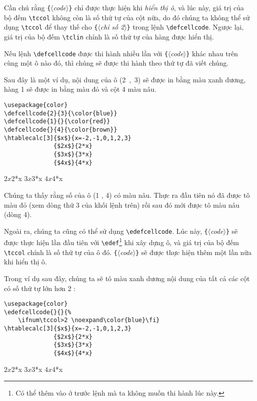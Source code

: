 \documentclass[a4paper,10pt]{article}
\newcommand\argu[1]{$\langle$\textit{#1}$\rangle$}
\newcommand\ARGU[1]{\texttt{\{}\argu{#1}\texttt{\}}}
\newcommand\verbinline{\lstinline[breaklines=false,basicstyle=\normalsize\ttfamily]}
\newcommand\mywidth{0.85\linewidth}
\begin{document}
Cần chú rằng \ARGU{code} chỉ được thực hiện khi \emph{hiển thị ô}, và lúc này, giá trị của bộ đếm \verbinline|\tccol| không còn là số thứ tự của cột nữa, do đó chúng ta không thể sử dụng \verbinline|\tccol| để thay thế cho \ARGU{chỉ số 2} trong lệnh \verbinline|\defcellcode|. Ngược lại, giá trị của bộ đếm \verbinline|\tclin| chính là số thứ tự của hàng được hiển thị.

Nếu lệnh \verbinline|\defcellcode| được thi hành nhiều lần với \ARGU{code} khác nhau trên cùng một ô nào đó, thì chúng sẽ được thi hành theo thứ tự đã viết chúng.\medskip

Sau đây là một ví dụ, nội dung của ô (2~,~3) sẽ được in bằng màu xanh dương, hàng 1 sẽ được in bằng màu đỏ và cột 4 màu nâu.

\begin{center}
\begin{minipage}{\mywidth}
\begin{lstlisting}
\usepackage{color}
\defcellcode{2}{3}{\color{blue}}
\defcellcode{1}{}{\color{red}}
\defcellcode{}{4}{\color{brown}}
\htablecalc[3]{$x$}{x=-2,-1,0,1,2,3}
              {$2x$}{2*x}
              {$3x$}{3*x}
              {$4x$}{4*x}
\end{lstlisting}
\end{minipage}

              {$2x$}{2*x}
              {$3x$}{3*x}
              {$4x$}{4*x}
\end{center}

Chúng ta thấy rằng số {\color{brown}} của ô (1 , 4) có màu nâu. Thực ra đầu tiên nó đã được tô màu đỏ (xem dòng thứ 3 của khối lệnh trên) rồi sau đó mới được tô màu nâu (dòng 4).\bigskip

Ngoài ra, chúng ta cũng có thể sử dụng \verbinline|\edefcellcode|. Lúc này, \ARGU{code} sẽ được thực hiện lần đầu tiên với \verbinline|\edef|\footnote{Có thể thêm vào \texttt{\string\noexpand} ở trước lệnh mà ta không muốn thi hành lúc này.} khi xây dựng ô, và giá trị của bộ đếm \verbinline|\tccol| chính là số thứ tự của ô đó. \ARGU{code} sẽ được thực hiện thêm một lần nữa khi hiển thị ô.\medskip

Trong ví dụ sau đây, chúng ta sẽ tô màu xanh dương nội dung của tất cả các cột có số thứ tự lớn hơn 2 :

\begin{center}
\begin{minipage}{\mywidth}
\begin{lstlisting}
\usepackage{color}
\edefcellcode{}{}{%
	\ifnum\tccol>2 \noexpand\color{blue}\fi}
\htablecalc[3]{$x$}{x=-2,-1,0,1,2,3}
              {$2x$}{2*x}
              {$3x$}{3*x}
              {$4x$}{4*x}
\end{lstlisting}
\end{minipage}

\edefcellcode{}{}{%
	\ifnum\tccol>2 \noexpand\color{blue}\fi}
              {$2x$}{2*x}
              {$3x$}{3*x}
              {$4x$}{4*x}
\end{center}
\end{document}

